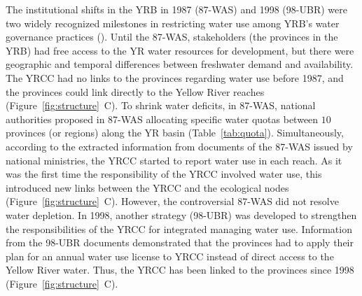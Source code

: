The institutional shifts in the YRB in 1987 (87-WAS) and 1998 (98-UBR) were two widely recognized milestones in restricting water use among YRB's water governance practices (\textit{}).
Until the 87-WAS, stakeholders (the provinces in the YRB) had free access to the YR water resources for development, but there were geographic and temporal differences between freshwater demand and availability.
The YRCC had no links to the provinces regarding water use before 1987, and the provinces could link directly to the Yellow River reaches (Figure~\ref{fig:structure}~C).
To shrink water deficits, in 87-WAS, national authorities proposed in 87-WAS allocating specific water quotas between $10$ provinces (or regions) along the YR basin (Table~\ref{tab:quota}).
Simultaneously, according to the extracted information from documents of the 87-WAS issued by national ministries, the YRCC started to report water use in each reach.
As it was the first time the responsibility of the YRCC involved water use, this introduced new links between the YRCC and the ecological nodes (Figure~\ref{fig:structure}~C).
However, the controversial 87-WAS did not resolve water depletion.
In 1998, another strategy (98-UBR) was developed to strengthen the responsibilities of the YRCC for integrated managing water use.
Information from the 98-UBR documents demonstrated that the provinces had to apply their plan for an annual water use license to YRCC instead of direct access to the Yellow River water.
Thus, the YRCC has been linked to the provinces since 1998 (Figure~\ref{fig:structure}~C).
